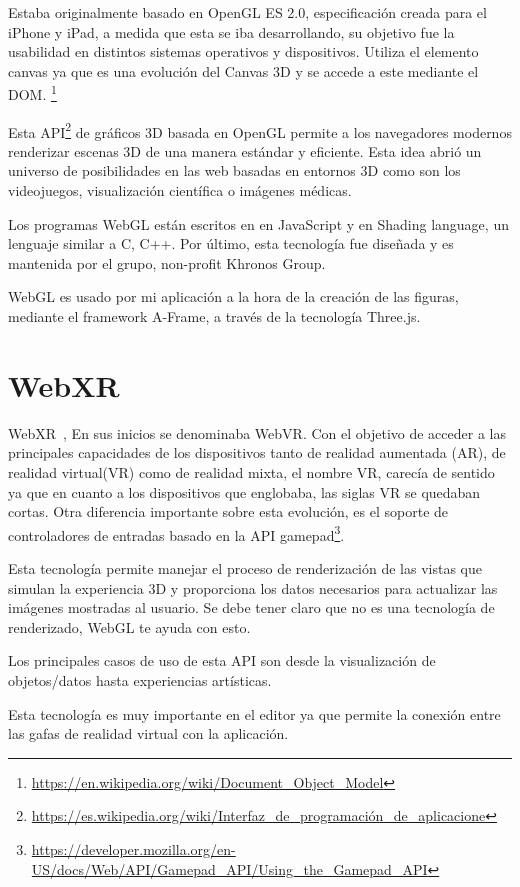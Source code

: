 \documentclass[a4paper, 12pt]{book}
\begin{document}
Estaba originalmente basado en OpenGL ES 2.0, especificación creada para el iPhone y iPad, a medida que esta se iba desarrollando, su objetivo fue la usabilidad en distintos sistemas operativos y dispositivos. Utiliza el elemento canvas ya que es una evolución del Canvas 3D y se accede a este mediante el DOM. \footnote{\url{https://en.wikipedia.org/wiki/Document_Object_Model}}

Esta API\footnote{\url{https://es.wikipedia.org/wiki/Interfaz_de_programación_de_aplicacione}} de gráficos 3D basada en OpenGL permite a los navegadores modernos renderizar escenas 3D de una manera estándar y eficiente. Esta idea abrió un universo de posibilidades en las web basadas en entornos 3D como son los videojuegos, visualización científica o imágenes médicas. 

Los programas WebGL están escritos en en JavaScript y en Shading language, un lenguaje similar a C, C++. Por último, esta tecnología fue diseñada y es mantenida por el grupo, non-profit Khronos Group.

WebGL es usado por mi aplicación a la hora de la creación de las figuras, mediante el framework A-Frame, a través de la tecnología Three.js.

\section{WebXR} %
\label{sec:WebXR}
WebXR~\cite{webXR}, En sus inicios se denominaba WebVR. Con el objetivo de acceder a las principales capacidades de los dispositivos tanto de realidad aumentada (AR), de realidad virtual(VR) como de realidad mixta, el nombre VR, carecía de sentido ya que en cuanto a los dispositivos que englobaba, las siglas VR se quedaban cortas. Otra diferencia importante sobre esta evolución, es el soporte de controladores de entradas basado en la API gamepad\footnote{\url{https://developer.mozilla.org/en-US/docs/Web/API/Gamepad_API/Using_the_Gamepad_API}}.

Esta tecnología permite manejar el proceso de renderización de las vistas que simulan la experiencia 3D y proporciona los datos necesarios para actualizar las imágenes mostradas al usuario. Se debe tener claro que no es una tecnología de renderizado, WebGL te ayuda con esto.

Los principales casos de uso de esta API son desde la visualización de objetos/datos hasta experiencias artísticas. 

Esta tecnología es muy importante en el editor ya que permite la conexión entre las gafas de realidad virtual con la aplicación.
\end{document}
